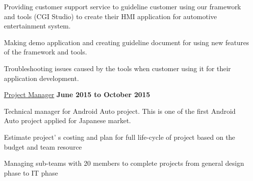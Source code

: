 \documentclass[10pt]{article}
\renewcommand\textit[1]{\underline{#1}}
\newcommand{\halfblankline}{\quad\vspace{-0.5\baselineskip}\pagebreak[3]}
\begin{document}
\begin{outerlist}
\begin{enumerate}
		
			\end{enumerate}

            
    \item[] \textit{Project Manager}%
            \hfill \textbf{June 2015 to October 2015}          
            \begin{innerlist}
                \item Technical manager for Android Auto project. This is one of the first Android Auto project applied for Japanese market.

                \item Estimate  project' s  costing  and  plan  for  full  life-cycle  of  project  based  on  the  budget  and team  resource

	     	  \item  Managing sub-teams with 20 members  to  complete  projects  from  general design  phase  to  IT  phase 
            \end{innerlist}    
                       

\end{outerlist}

\halfblankline
\end{document}
